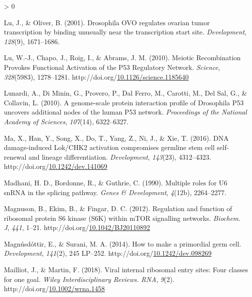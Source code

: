 \documentclass[12pt,oneside]{reedthesis}
\newlength{\cslhangindent}
\newenvironment{CSLReferences}[2] %
 {%
  \setlength{\parindent}{0pt}
  \ifodd #1 \everypar{\setlength{\hangindent}{\cslhangindent}}\ignorespaces\fi
  \ifnum #2 > 0
  \setlength{\parskip}{#2\baselineskip}
  \fi
 }%
 {}
\begin{document}
\begin{CSLReferences}{1}{0}
\leavevmode\hypertarget{ref-Lu2001}{}%
Lu, J., \& Oliver, B. (2001). Drosophila {OVO} regulates ovarian tumor transcription by binding unusually near the transcription start site. \emph{Development}, \emph{128}(9), 1671--1686.

\leavevmode\hypertarget{ref-luMeioticRecombinationProvokes2010}{}%
Lu, W.-J., Chapo, J., Roig, I., \& Abrams, J. M. (2010). Meiotic {Recombination Provokes Functional Activation} of the P53 {Regulatory Network}. \emph{Science}, \emph{328}(5983), 1278--1281. http://doi.org/\href{https://doi.org/10.1126/science.1185640}{10.1126/science.1185640}

\leavevmode\hypertarget{ref-Lunardi2010a}{}%
Lunardi, A., Di Minin, G., Provero, P., Dal Ferro, M., Carotti, M., Del Sal, G., \& Collavin, L. (2010). A genome-scale protein interaction profile of {Drosophila} P53 uncovers additional nodes of the human P53 network. \emph{Proceedings of the National Academy of Sciences}, \emph{107}(14), 6322--6327.

\leavevmode\hypertarget{ref-maDNADamageinducedLok2016}{}%
Ma, X., Han, Y., Song, X., Do, T., Yang, Z., Ni, J., \& Xie, T. (2016). {DNA} damage-induced {Lok}/{CHK2} activation compromises germline stem cell self-renewal and lineage differentiation. \emph{Development}, \emph{143}(23), 4312--4323. http://doi.org/\href{https://doi.org/10.1242/dev.141069}{10.1242/dev.141069}

\leavevmode\hypertarget{ref-Madhani1990}{}%
Madhani, H. D., Bordonne, R., \& Guthrie, C. (1990). Multiple roles for {U6 snRNA} in the splicing pathway. \emph{Genes \& Development}, \emph{4}(12b), 2264--2277.

\leavevmode\hypertarget{ref-Magnuson2012c}{}%
Magnuson, B., Ekim, B., \& Fingar, D. C. (2012). Regulation and function of ribosomal protein {S6} kinase ({S6K}) within {mTOR} signalling networks. \emph{Biochem. J}, \emph{441}, 1--21. http://doi.org/\href{https://doi.org/10.1042/BJ20110892}{10.1042/BJ20110892}

\leavevmode\hypertarget{ref-Magnusdottir2014d}{}%
Magnúsdóttir, E., \& Surani, M. A. (2014). How to make a primordial germ cell. \emph{Development}, \emph{141}(2), 245 LP--252. http://doi.org/\href{https://doi.org/10.1242/dev.098269}{10.1242/dev.098269}

\leavevmode\hypertarget{ref-mailliotViralInternalRibosomal2018}{}%
Mailliot, J., \& Martin, F. (2018). Viral internal ribosomal entry sites: Four classes for one goal. \emph{Wiley Interdisciplinary Reviews. RNA}, \emph{9}(2). http://doi.org/\href{https://doi.org/10.1002/wrna.1458}{10.1002/wrna.1458}


\end{CSLReferences}
\end{document}
